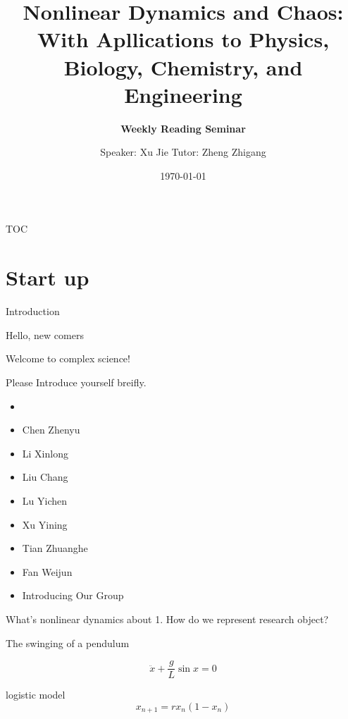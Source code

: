 \documentclass[9pt,aspectratio=43,mathserif,table]{beamer}
\title{Nonlinear Dynamics and Chaos: With Apllications to Physics, Biology, Chemistry, and Engineering}
\subtitle{\fontsize{9pt}{14pt}\textbf{Weekly Reading Seminar}}
\author{Speaker: Xu Jie \quad \newline  \newline \quad Tutor: Zheng Zhigang}
\institute{\fontsize{8pt}{14pt}College of Information Science \& Engineering, Huaqiao University}
\date{\today}
\begin{document}

\frame{\titlepage}

\section[TOC]{}   %
\begin{frame}{TOC}
\tableofcontents
\end{frame}

\section{Start up}
\begin{frame}{Introduction}
  \begin{center}
   Hello, new comers

   \medskip

   Welcome to complex science! 

   \medskip

   Please Introduce yourself breifly.
  \end{center}

  \begin{itemize}
    \item [] 
    \item Chen Zhenyu
    \item Li Xinlong
    \item Liu Chang
    \item Lu Yichen
    \item Xu Yining
    \item Tian Zhuanghe
    \item Fan Weijun
    \item Introducing Our Group
  \end{itemize}

\end{frame}

\begin{frame}{What's nonlinear dynamics about}
    1. How do we represent research object?

    \bigskip

    The swinging of a pendulum

    $$\ddot x + \frac{ g}{L} \sin x = 0$$

    logistic model
    $$x_{n+1} = r x_n (1 - x_n)$$
\end{frame}
\end{document}
